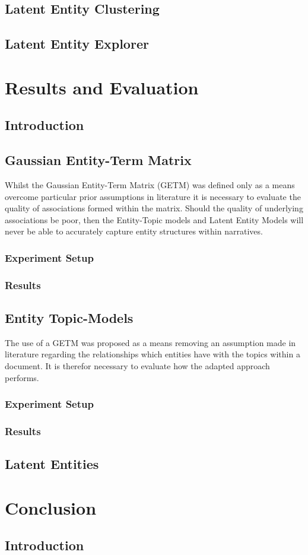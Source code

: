 \documentclass[10pt]{report}
\begin{document}
\section{Latent Entity Clustering }

\section{Latent Entity Explorer}
%
%
%
%
%
\chapter{Results and Evaluation}
\section{Introduction}

\section{Gaussian Entity-Term Matrix}
Whilst the Gaussian Entity-Term Matrix (GETM) was defined only as a means overcome particular prior assumptions in literature it is necessary to evaluate the quality of associations formed within the matrix. Should the quality of underlying associations be poor, then the Entity-Topic models and Latent Entity Models will never be able to accurately capture entity structures within narratives.

\subsection{Experiment Setup}

\subsection{Results}

\section{Entity Topic-Models}
The use of a GETM was proposed as a means removing an assumption made in literature regarding the relationships which entities have with the topics within a document. It is therefor necessary to evaluate how the adapted approach performs.

\subsection{Experiment Setup}

\subsection{Results}

\section{Latent Entities}

%
%
%
%
%
\chapter{Conclusion}
\section{Introduction}

\renewcommand{\baselinestretch}{1.0}\normalsize


\end{document}

